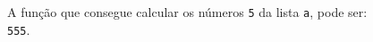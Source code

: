 \documentclass[12pt,varwidth=16cm,border=1pt]{standalone}
\begin{document}
A função que consegue calcular os números \verb+5+ da lista \verb+a+, pode ser: \\ \verb+555+.

\questiomfalse
\end{document}
